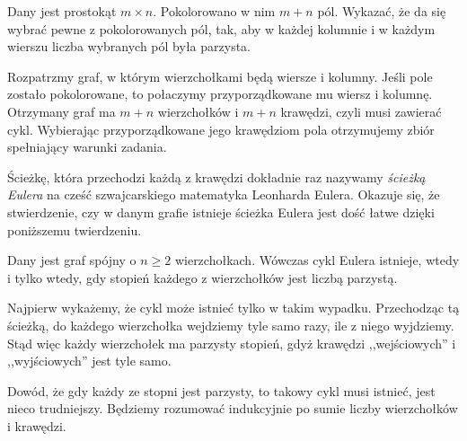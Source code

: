 \vspace{10px}



\noindent
Dany jest prostokąt $m \times n$. Pokolorowano w nim $m + n$ pól. Wykazać, że da się wybrać pewne z pokolorowanych pól, tak, aby w każdej kolumnie i w każdym wierszu liczba wybranych pól była parzysta.

\vspace{5px}


\noindent
Rozpatrzmy graf, w którym wierzchołkami będą wiersze i kolumny. Jeśli pole zostało pokolorowane, to połaczymy przyporządkowane mu wiersz i kolumnę. Otrzymany graf ma $m + n$ wierzchołków i $m + n$ krawędzi, czyli musi zawierać cykl. Wybierając przyporządkowane jego krawędziom pola otrzymujemy zbiór spełniający warunki zadania.

\vspace{10px}

\noindent
Ścieżkę, która przechodzi każdą z krawędzi dokładnie raz nazywamy \textit{ścieżką Eulera} na cześć szwajcarskiego matematyka Leonharda Eulera. Okazuje się, że stwierdzenie, czy w danym grafie istnieje ścieżka Eulera jest dość łatwe dzięki poniższemu twierdzeniu.

\vspace{10px}


\noindent
Dany jest graf spójny o $n \geqslant 2$ wierzchołkach. Wówczas cykl Eulera istnieje, wtedy i tylko wtedy, gdy stopień każdego z wierzchołków jest liczbą parzystą.

\vspace{5px}


\noindent
Najpierw wykażemy, że cykl może istnieć tylko w takim wypadku. Przechodząc tą ścieżką, do każdego wierzchołka wejdziemy tyle samo razy, ile z niego wyjdziemy. Stąd więc każdy wierzchołek ma parzysty stopień, gdyż krawędzi ,,wejściowych'' i ,,wyjściowych'' jest tyle samo.

\vspace{10 px}

\noindent
Dowód, że gdy każdy ze stopni jest parzysty, to takowy cykl musi istnieć, jest nieco trudniejszy. Będziemy rozumować indukcyjnie po sumie liczby wierzchołków i krawędzi.

\vspace{5px}

